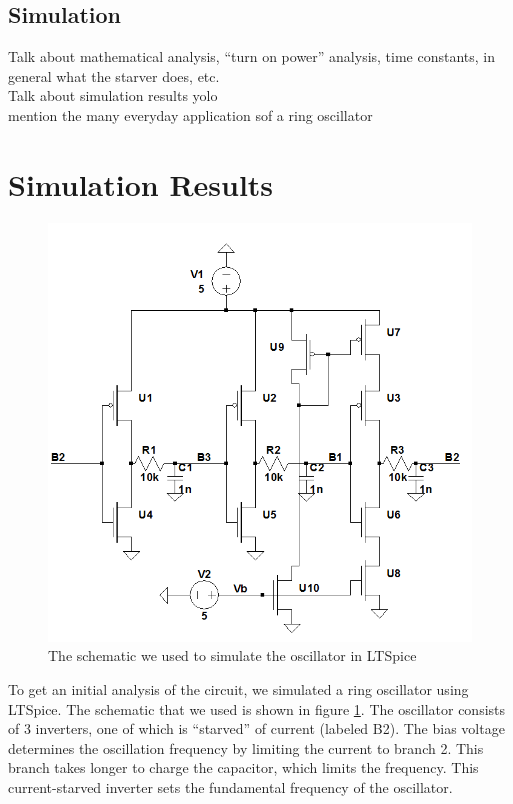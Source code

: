 \documentclass{article}
\begin{document}
\subsection*{Simulation}

Talk about mathematical analysis, ``turn on power'' analysis, time constants, in general what the starver does, etc.\\
Talk about simulation results yolo\\
mention the many everyday application sof a ring oscillator

\section*{Simulation Results}

\begin{figure}[H]
\centering
\includegraphics[scale=.5]{finalSchem2.png}
\caption{The schematic we used to simulate the oscillator in LTSpice}
\label{schem}
\end{figure}

To get an initial analysis of the circuit, we simulated a ring oscillator using LTSpice. The schematic that we used is shown in figure \ref{schem}. The oscillator consists of 3 inverters, one of which is ``starved'' of current (labeled B2). The bias voltage determines the oscillation frequency by limiting the current to branch 2. This branch takes longer to charge the capacitor, which limits the frequency. This current-starved inverter sets the fundamental frequency of the oscillator. \\
\end{document}
